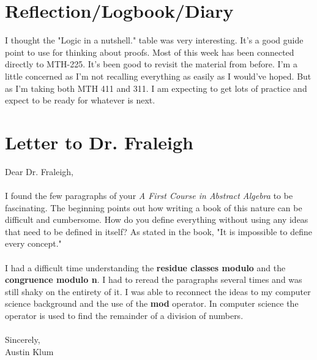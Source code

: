 \documentclass[11pt]{article}
\theoremstyle{plain}
\theoremstyle{definition}
\begin{document}
	\section{Reflection/Logbook/Diary}
	I thought the "Logic in a nutshell." table was very interesting. It's a good guide point to use for thinking about proofs. Most of this week has been connected directly to MTH-225. It's been good to revisit the material from before. I'm a little concerned as I'm not recalling everything as easily as I would've hoped. But as I'm taking both MTH 411 and 311. I am expecting to get lots of practice and expect to be ready for whatever is next.
	\section{Letter to Dr. Fraleigh}
	Dear Dr. Fraleigh,\\
	\\
	I found the few paragraphs of your \textit{A First Course in Abstract Algebra} to be fascinating. The beginning points out how writing a book of this nature can be difficult and cumbersome. How do you define everything without using any ideas that need to be defined in itself? As stated in the book, "It is impossible to define every concept." \\
	\\
	I had a difficult time understanding the \textbf{residue classes modulo} and the \textbf{congruence modulo n}. I had to reread the paragraphs several times and was still shaky on the entirety of it. I was able to reconnect the ideas to my computer science background and the use of the \textbf{mod} operator. In computer science the operator is used to find the remainder of a division of numbers. \\
	\\
	Sincerely,\\
	Austin Klum
\end{document}

